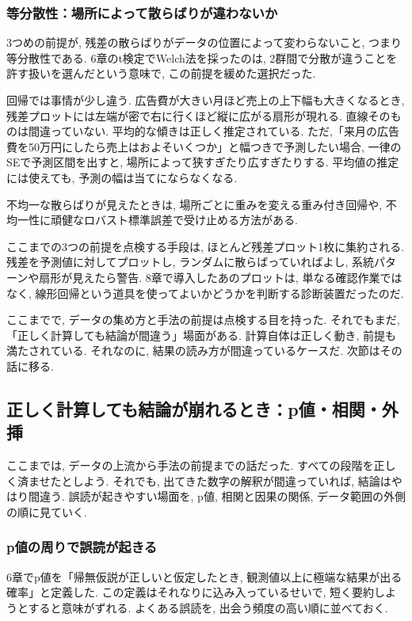 \subsubsection*{等分散性：場所によって散らばりが違わないか}

3つめの前提が, 残差の散らばりがデータの位置によって変わらないこと, つまり等分散性である.
6章のt検定でWelch法を採ったのは, 2群間で分散が違うことを許す扱いを選んだという意味で, この前提を緩めた選択だった.

回帰では事情が少し違う.
広告費が大きい月ほど売上の上下幅も大きくなるとき, 残差プロットには左端が密で右に行くほど縦に広がる扇形が現れる.
直線そのものは間違っていない. 平均的な傾きは正しく推定されている.
ただ,「来月の広告費を50万円にしたら売上はおよそいくつか」と幅つきで予測したい場合, 一律のSEで予測区間を出すと, 場所によって狭すぎたり広すぎたりする.
平均値の推定には使えても, 予測の幅は当てにならなくなる.

不均一な散らばりが見えたときは, 場所ごとに重みを変える重み付き回帰や, 不均一性に頑健なロバスト標準誤差で受け止める方法がある.

ここまでの3つの前提を点検する手段は, ほとんど残差プロット1枚に集約される.
残差を予測値に対してプロットし, ランダムに散らばっていればよし, 系統パターンや扇形が見えたら警告.
8章で導入したあのプロットは, 単なる確認作業ではなく, 線形回帰という道具を使ってよいかどうかを判断する診断装置だったのだ.

ここまでで, データの集め方と手法の前提は点検する目を持った.
それでもまだ,「正しく計算しても結論が間違う」場面がある.
計算自体は正しく動き, 前提も満たされている. それなのに, 結果の読み方が間違っているケースだ.
次節はその話に移る.


\subsection{正しく計算しても結論が崩れるとき：p値・相関・外挿}

ここまでは, データの上流から手法の前提までの話だった.
すべての段階を正しく済ませたとしよう.
それでも, 出てきた数字の解釈が間違っていれば, 結論はやはり間違う.
誤読が起きやすい場面を, p値, 相関と因果の関係, データ範囲の外側の順に見ていく.

\subsubsection*{p値の周りで誤読が起きる}

6章でp値を「帰無仮説が正しいと仮定したとき, 観測値以上に極端な結果が出る確率」と定義した.
この定義はそれなりに込み入っているせいで, 短く要約しようとすると意味がずれる.
よくある誤読を, 出会う頻度の高い順に並べておく.

